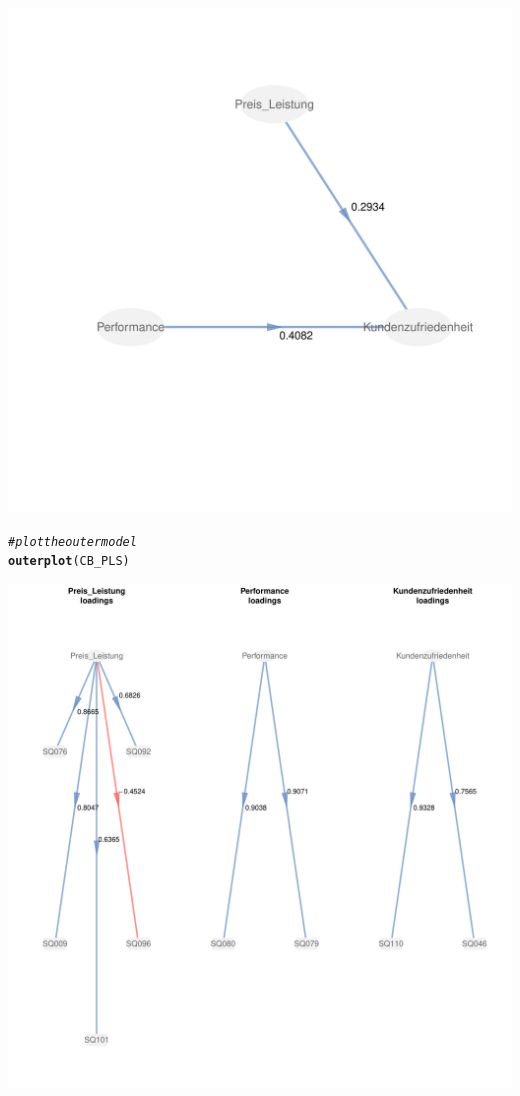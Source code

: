 \documentclass{article}\usepackage[]{graphicx}\usepackage[]{color}
\makeatletter
\def\maxwidth{ %
  \ifdim\Gin@nat@width>\linewidth
    \linewidth
  \else
    \Gin@nat@width
  \fi
}
\newcommand{\hlcom}[1]{\textcolor[rgb]{0.678,0.584,0.686}{\textit{#1}}}%
\newcommand{\hlstd}[1]{\textcolor[rgb]{0.345,0.345,0.345}{#1}}%
\newcommand{\hlkwd}[1]{\textcolor[rgb]{0.737,0.353,0.396}{\textbf{#1}}}%
\newenvironment{kframe}{%
 \def\at@end@of@kframe{}%
 \ifinner\ifhmode%
  \def\at@end@of@kframe{\end{minipage}}%
  \begin{minipage}{\columnwidth}%
 \fi\fi%
 \def\FrameCommand##1{\hskip\@totalleftmargin \hskip-\fboxsep
 \colorbox{shadecolor}{##1}\hskip-\fboxsep
     \hskip-\linewidth \hskip-\@totalleftmargin \hskip\columnwidth}%
 \MakeFramed {\advance\hsize-\width
   \@totalleftmargin\z@ \linewidth\hsize
   \@setminipage}}%
 {\par\unskip\endMakeFramed%
 \at@end@of@kframe}
\newenvironment{knitrout}{}{} %
\makeatother
\begin{document}
\begin{knitrout}
\begin{kframe}
\begin{alltt}
\end{alltt}
\end{kframe}
\includegraphics[width=\maxwidth]{figure/zoo-1} 
\begin{kframe}\begin{alltt}
\hlcom{#plot the outer model}
\hlkwd{outerplot}\hlstd{(CB_PLS)}
\end{alltt}
\end{kframe}
\includegraphics[width=\maxwidth]{figure/zoo-2} 

\end{knitrout}
\end{document}

